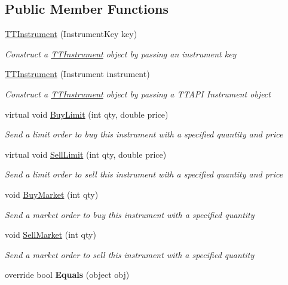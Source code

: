 \subsection*{Public Member Functions}
\begin{DoxyCompactItemize}
\item 
\hyperlink{class_e_z_a_p_i_1_1_containers_1_1_t_t_instrument_abeb0fbcd0b9543885ab48e3df0b5955d}{T\-T\-Instrument} (Instrument\-Key key)
\begin{DoxyCompactList}\small\item\em Construct a \hyperlink{class_e_z_a_p_i_1_1_containers_1_1_t_t_instrument}{T\-T\-Instrument} object by passing an instrument key \end{DoxyCompactList}\item 
\hyperlink{class_e_z_a_p_i_1_1_containers_1_1_t_t_instrument_a619b592b214212350338fcf84788c7fa}{T\-T\-Instrument} (Instrument instrument)
\begin{DoxyCompactList}\small\item\em Construct a \hyperlink{class_e_z_a_p_i_1_1_containers_1_1_t_t_instrument}{T\-T\-Instrument} object by passing a T\-T\-A\-P\-I Instrument object \end{DoxyCompactList}\item 
virtual void \hyperlink{class_e_z_a_p_i_1_1_containers_1_1_t_t_instrument_a17979284f7b5d23d932cbeadb0b24b40}{Buy\-Limit} (int qty, double price)
\begin{DoxyCompactList}\small\item\em Send a limit order to buy this instrument with a specified quantity and price \end{DoxyCompactList}\item 
virtual void \hyperlink{class_e_z_a_p_i_1_1_containers_1_1_t_t_instrument_ad6c46109676176d269e06b464b2bcf97}{Sell\-Limit} (int qty, double price)
\begin{DoxyCompactList}\small\item\em Send a limit order to sell this instrument with a specified quantity and price \end{DoxyCompactList}\item 
void \hyperlink{class_e_z_a_p_i_1_1_containers_1_1_t_t_instrument_a36ed4414282000f9fbfc1a053a71ad33}{Buy\-Market} (int qty)
\begin{DoxyCompactList}\small\item\em Send a market order to buy this instrument with a specified quantity \end{DoxyCompactList}\item 
void \hyperlink{class_e_z_a_p_i_1_1_containers_1_1_t_t_instrument_a323071a78e4a57d288c0ed259b607dd8}{Sell\-Market} (int qty)
\begin{DoxyCompactList}\small\item\em Send a market order to sell this instrument with a specified quantity \end{DoxyCompactList}\item 
\hypertarget{class_e_z_a_p_i_1_1_containers_1_1_t_t_instrument_a12216ee2d4fe1d71ad04cb69dddd69a1}{override bool {\bfseries Equals} (object obj)}\label{class_e_z_a_p_i_1_1_containers_1_1_t_t_instrument_a12216ee2d4fe1d71ad04cb69dddd69a1}


\end{DoxyCompactItemize}

